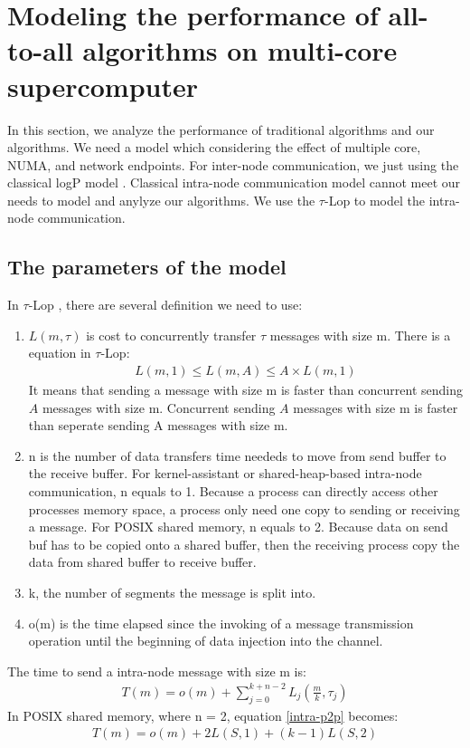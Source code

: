 \section{Modeling the performance of all-to-all algorithms on multi-core supercomputer}

In this section, we analyze the performance of traditional algorithms and our algorithms.
We need a model which considering the effect of multiple core, NUMA, and network endpoints.
For inter-node communication, we just using the classical logP model \cite{culler1993logp}.
Classical intra-node communication model cannot meet our needs to model and anylyze our algorithms.
We use the $\tau$-Lop \cite{rico2015tau} to model the intra-node communication.

\subsection {The parameters of the model}
In $\tau$-Lop \cite{rico2015tau}, there are several definition we need to use:
\begin{enumerate}[(1)]
\item $L(m,\tau)$ is cost to concurrently transfer $\tau$ messages with size m. There is a equation in $\tau$-Lop: 
\begin{equation}
\label{concurrently-p2p}
\begin{split}
L(m,1) \le L(m,A) \le A\times L(m,1)
\end{split}
\end{equation}
It means that sending a message with size m is faster than concurrent sending $A$ messages with size m. 
Concurrent sending $A$ messages with size m is faster than seperate sending A messages with size m.
\item n is the number of data transfers time neededs to move from send buffer to the receive buffer. 
For kernel-assistant or shared-heap-based intra-node communication, n equals to 1.
Because a process can directly access other processes memory space, a process only need one copy to sending or receiving a message.
For POSIX shared memory, n equals to 2.
Because data on send buf has to be copied onto a shared buffer, then the receiving process copy the data from shared buffer to receive buffer.
\item k, the number of segments the message is split into.
\item o(m) is the time elapsed since the invoking of a message transmission operation until the beginning of data injection into the channel.
\end{enumerate}
The time to send a intra-node message with size m is:
\begin{equation}
\begin{split}
T(m) = o(m) + \sum_{j=0}^{k+n-2}L_j(\frac{m}{k},\tau{_j})
\end{split}
\label{intra-p2p}
\end{equation}
In POSIX shared memory, where n = 2, equation \ref{intra-p2p} becomes:
\begin{equation}
\begin{split}
T(m) = o(m) + 2L(S,1) + (k-1)L(S,2)
\end{split}
\label{real-p2p}
\end{equation}

